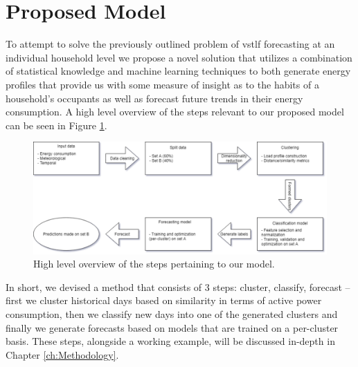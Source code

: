 \section{Proposed Model}
\label{sec:Introduction:Propose-Model}
To attempt to solve the previously outlined problem of \gls{vstlf} forecasting at an individual household level we propose a novel solution that utilizes a combination of statistical knowledge and machine learning techniques to both generate energy profiles that provide us with some measure of insight as to the habits of a household's occupants as well as forecast future trends in their energy consumption. A high level overview of the steps relevant to our proposed model can be seen in Figure \ref{fig:Proposed-Model-1}.

\null \vspace{0.5em}

\begin{figure}[H]
    \begin{adjustwidth}{-3.0cm}{-3.0cm}%
        \centering
        \includegraphics[width=\linewidth]{Images/Chapter 1/Other/High Level Model.pdf}
        \caption{High level overview of the steps pertaining to our model.}
        \label{fig:Proposed-Model-1}
    \end{adjustwidth}
\end{figure}

In short, we devised a method that consists of 3 steps: cluster, classify, forecast -- first we cluster historical days based on similarity in terms of active power consumption, then we classify new days into one of the generated clusters and finally we generate forecasts based on models that are trained on a per-cluster basis. These steps, alongside a working example, will be discussed in-depth in Chapter \ref{ch:Methodology}.